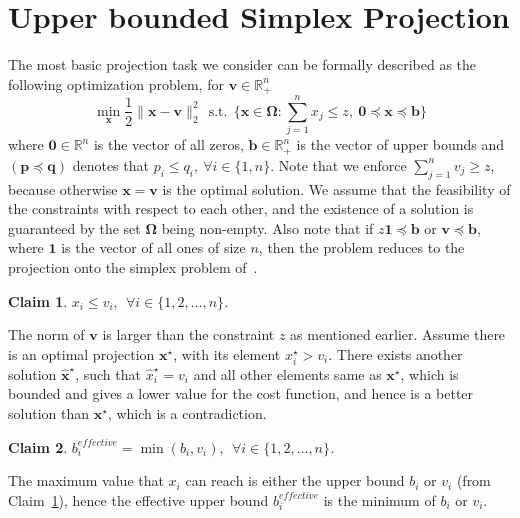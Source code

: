 \documentclass{article}
\newcommand{\mathbs}{\boldsymbol}
\newtheorem{claim}{Claim}
\begin{document}
\section{Upper bounded Simplex Projection}\label{SEC:UBSP}
The most basic projection task we consider can be formally described as the following optimization problem, for $\mathbf{v} \in \mathbb{R}^{n}_+$
\begin{equation}\label{Eqn:Min_generic}
    \min_{\mathbf{{x}}} \frac{1}{2}\|\mathbf{{x}-v}\|_2^2
  ~~\textrm{s.t.} ~~ \{\mathbf{x}\in \mathbs{\Omega}: \sum_{j=1}^n x_j \le z, ~\mathbf{0} \preccurlyeq \mathbf{x} \preccurlyeq \mathbf{b} \}
\end{equation}
where $\mathbf{0}\in {\mathbb{R}}^n$ is the vector of all zeros, $\mathbf{b}\in {\mathbb{R}}^n_+$ is the vector of upper bounds and $(\mathbf{p}\preccurlyeq \mathbf{q})$ denotes that $p_i \le q_i, ~\forall i\in\{1,n\}$.
Note that we enforce $\sum_{j=1}^n v_j \ge z$, because otherwise $\mathbf{x = v}$ is the optimal solution.
We assume that the feasibility of the constraints with respect to each other, and the existence of a solution is guaranteed by the set $\mathbs{\Omega}$ being non-empty.
Also note that if $z\mathbf{1}\preccurlyeq \mathbf{b}$ or $\mathbf{v}\preccurlyeq \mathbf{b}$, where $\mathbf{1}$ is the vector of all ones of size $n$, then the problem reduces to the projection onto the simplex problem of~\cite{Duchi08}.
\begin{claim}\label{Claim:x_is less_than_v}
$x_i \le v_i,~~\forall i\in\{1,2,\ldots,n\}$.
\end{claim}

The norm of $\mathbf{v}$ is larger than the constraint $z$ as mentioned earlier. Assume there is an optimal projection $\mathbf{x}^{\star}$, with its element $x^{\star}_i > v_i$. There exists another solution $\mathbf{\hat{x}}^{\star}$, such that $\hat{x}^{\star}_i = v_i$ and all other elements same as $\mathbf{x}^{\star}$, which is bounded and gives a lower value for the cost function, and hence is a better solution than $\mathbf{x}^{\star}$, which is a contradiction.

\begin{claim}\label{Claim:effective_lb}
$b_i^{effective} = \min (b_i, v_i),~~\forall i\in\{1,2,\ldots,n\}$.
\end{claim}

The maximum value that $x_i$ can reach is either the upper bound $b_i$ or $v_i$ (from Claim~\ref{Claim:x_is less_than_v}), hence the effective upper bound $b_i^{effective}$ is the minimum of $b_i$ or $v_i$.
\end{document}
